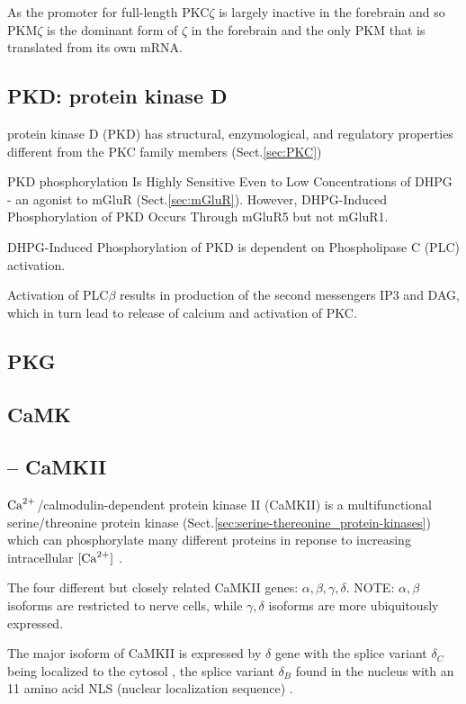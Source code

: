 As the promoter for full-length PKC$\zeta$ is largely inactive in the forebrain
and so PKM$\zeta$ is the dominant form of $\zeta$ in the forebrain and the only
PKM that is translated from its own mRNA.



\subsection{PKD: protein kinase D}
\label{sec:PKD}

protein kinase D (PKD) has structural, 
enzymological, and regulatory properties different from the PKC family members
(Sect.\ref{sec:PKC})

PKD phosphorylation Is Highly Sensitive Even to Low Concentrations of DHPG - an
agonist to mGluR (Sect.\ref{sec:mGluR}). However, DHPG-Induced Phosphorylation
of PKD Occurs Through mGluR5 but not mGluR1.

DHPG-Induced Phosphorylation of PKD is dependent on Phospholipase C
(PLC) activation.

Activation of PLC$\beta$ results in production of the second messengers IP3 and
DAG, which in turn lead to release of calcium and activation of PKC.



\subsection{PKG}
\label{sec:PKG}

\subsection{CaMK}
\label{sec:CaMK}

\subsection{-- CaMKII}
\label{sec:CaMKII}

${\text{Ca}^{2+}}$/calmodulin-dependent protein kinase II (CaMKII) is a multifunctional
serine/threonine protein kinase
(Sect.\ref{sec:serine-thereonine_protein-kinases}) which can phosphorylate many
different proteins in reponse to increasing intracellular $[{\text{Ca}^{2+}}]$
\citep{hook2001}.

\begin{framed}
The four different but closely related CaMKII genes: $\alpha, \beta, \gamma,
\delta$. NOTE: $\alpha, \beta$ isoforms are restricted to nerve cells, while
$\gamma, \delta$ isoforms are more ubiquitously expressed. 

The major isoform of CaMKII is expressed by $\delta$ gene with the splice
variant $\delta_C$ being localized to the cytosol \citep{maier2007}, the splice
variant $\delta_B$ found in the nucleus with an 11 amino acid NLS (nuclear
localization sequence) \citep{edman1994}.

\end{framed}

